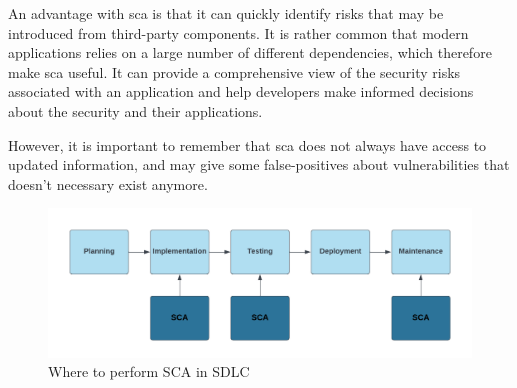 An advantage with \acrshort{sca} is that it can quickly identify risks that may be introduced from third-party components. It is rather common that modern applications relies on a large number of  different dependencies, which therefore make \acrshort{sca} useful. It can provide a comprehensive view of the security risks associated with an application and help developers make informed decisions about the security and their applications. 

However, it is important to remember that \acrshort{sca} does not always have access to updated information, and may give some false-positives about vulnerabilities that doesn't necessary exist anymore. 
\\
\begin{figure}[H]
    \centering
    \includegraphics[width=0.8\columnwidth]{Images/sca.png}
    \caption{Where to perform SCA in SDLC} 
    \label{fig:Where to perform SCA in SDLC}
\end{figure}

\newpage

